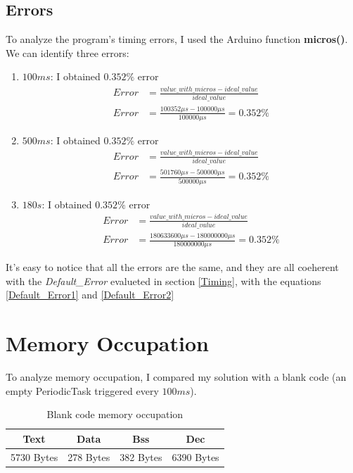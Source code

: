 \documentclass[a4paper]{article}
\begin{document}
\subsection{Errors}
To analyze the program's timing errors, I used the Arduino function \textbf{micros()}. We can identify three errors:
\begin{enumerate}
  \item \(100ms\): I obtained \(0.352\%\) error
        \begin{align*}
          Error & = \frac{value\_with\_micros - ideal\_value}{ideal\_value} \\[0.5ex]
          Error & = \frac{100352\mu s - 100000\mu s}{100000\mu s} = 0.352\%
        \end{align*}
  \item \(500ms\): I obtained \(0.352\%\) error
        \begin{align*}
          Error & = \frac{value\_with\_micros - ideal\_value}{ideal\_value} \\[0.5ex]
          Error & = \frac{501760\mu s - 500000\mu s}{500000\mu s} = 0.352\%
        \end{align*}
  \item \(180s\): I obtained \(0.352\%\) error
        \begin{align*}
          Error & = \frac{value\_with\_micros - ideal\_value}{ideal\_value}          \\[0.5ex]
          Error & = \frac{180633600\mu s - 180000000\mu s}{180000000\mu s} = 0.352\%
        \end{align*}
\end{enumerate}

It's easy to notice that all the errors are the same, and they are all coeherent with the \emph{Default\_Error} evalueted in section \ref{Timing}, with the equations \ref{Default_Error1} and \ref{Default_Error2}


\section{Memory Occupation}

To analyze memory occupation, I compared my solution with a blank code (an empty PeriodicTask triggered every \(100ms\)).

\begin{table}[h]
  \centering
  \begin{tabular}{|| c || c || c || c ||}
    \hline
    \textbf{Text} & \textbf{Data} & \textbf{Bss} & \textbf{Dec} \\
    \hline
    5730 Bytes    & 278 Bytes     & 382 Bytes    & 6390 Bytes   \\
    \hline
  \end{tabular}
  \caption{Blank code memory occupation}
  \label{Table1}
\end{table}
\end{document}
